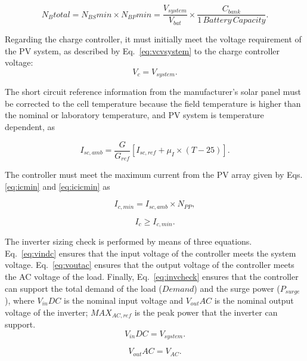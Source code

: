 \documentclass[review]{elsarticle}
\begin{document}
\begin{equation}
\label{eq:Nbtotal}
N_{B}total = N_{BS}min \times N_{BP}min = \dfrac{V_{system}}{V_{bat}} \times \dfrac{C_{bank}}{1 \,Battery \, Capacity}.
\end{equation}

Regarding the charge controller, it must initially meet the voltage requirement of the PV system, as described by Eq.~\eqref{eq:vcvsystem} to the charge controller voltage: 
\begin{equation}
\label{eq:vcvsystem}
V_{c} = V_{system}.
\end{equation}

The short circuit reference information from the manufacturer's solar panel must be corrected to the cell temperature because the field temperature is higher than the nominal or laboratory temperature, and PV system is temperature dependent, as 

\begin{equation}
\label{eq:iscamb}
I_{sc,amb} = \dfrac{G}{G_{ref}} \left[ I_{sc,ref} + \mu_{I} \times (T-25) \right]. 
\end{equation}

The controller must meet the maximum current from the PV array given by Eqs. \eqref{eq:icmin} and \eqref{eq:icicmin} as

\begin{equation}
\label{eq:icmin}
I_{c,min} = I_{sc,amb} \times N_{PP},
\end{equation}

\begin{equation}
\label{eq:icicmin}
I_{c} \geq I_{c,min}.
\end{equation}

The inverter sizing check is performed by means of three equations. Eq.~\eqref{eq:vindc} ensures that the input voltage of the controller meets the system voltage. Eq.~\eqref{eq:voutac} ensures that the output voltage of the controller meets the AC voltage of the load. Finally, Eq.~\eqref{eq:invcheck} ensures that the controller can support the total demand of the load ($Demand$) and the surge power ($P_{surge}$), where $V_{in}DC$ is the nominal input voltage and $V_{out}AC$ is the nominal output voltage of the inverter; $MAX_{AC,ref}$ is the peak power that the inverter can support.
%
\begin{equation}
\label{eq:vindc} 
V_{in}DC = V_{system}.
\end{equation}

\begin{equation}
\label{eq:voutac} 
V_{out}AC = V_{AC}.
\end{equation}
\end{document}
